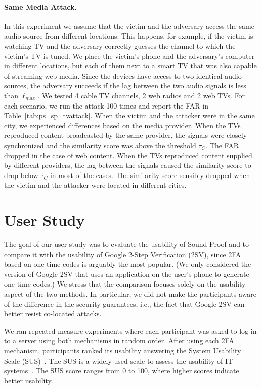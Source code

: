 \paragraph{Same Media Attack.}
In this experiment we assume that the victim and the adversary access the same audio source from different locations.
This happens, for example, if the victim is watching TV and the adversary correctly guesses the channel to which the victim's TV is tuned.
We place the victim's phone and the adversary's computer in different locations, but each of them next to a smart TV that was also capable of streaming web media.
Since the devices have access to two identical audio sources, the adversary succeeds if the lag between the two audio signals is less than $\ell_{max}$.
We tested 4 cable TV channels, 2 web radios and 2 web TVs.
For each scenario, we run the attack 100 times and report the FAR in  Table~\ref{tab:ps_sp_tvattack}.
When the  victim and the attacker were in the same city, we experienced differences based on the media provider.
When the TVs reproduced content broadcasted by the same provider, the signals were closely synchronized and the similarity score was above the threshold $\tau_C$.
The FAR dropped in the case of web content.
When the TVs reproduced content supplied by different providers, the lag between the signals caused the similarity score to drop below $\tau_C$ in most of the cases.
The similarity score sensibly dropped when the victim and the attacker were located in different cities.

\section{User Study}
\label{sec:ps_sp_userstudy}

The goal of our user study was to evaluate the usability of Sound-Proof and to compare it with the usability of Google 2-Step Verification (2SV), since 2FA based on one-time codes is arguably the most popular. (We only considered the version of Google 2SV that uses an application on the user's phone to generate one-time codes.)
We stress that the comparison focuses solely on the usability aspect of the two methods.
In particular, we did not make the participants aware of the difference in the security guarantees, i.e., the fact that Google 2SV can better resist co-located attacks.

We ran repeated-measure experiments where each participant was asked to log in to a server using both mechanisms in random order.
After using each 2FA mechanism, participants ranked its usability answering the System Usability Scale (SUS)~\cite{sus}.
The SUS is a widely-used scale to assess the usability of IT systems~\cite{bangor}.
The SUS score ranges from 0 to 100, where higher scores indicate better usability.

